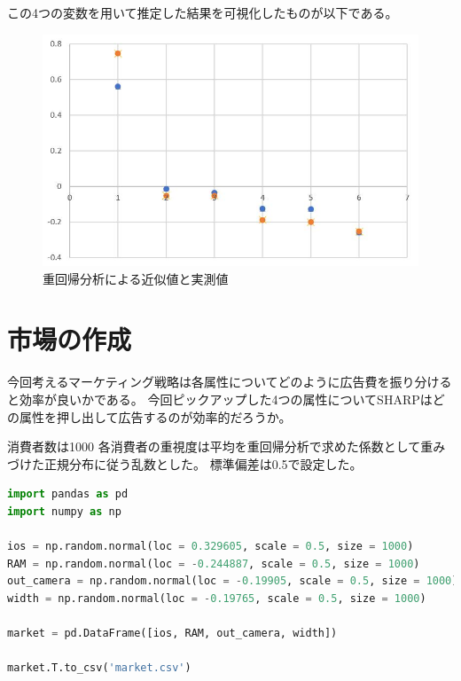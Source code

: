 \documentclass{jarticle}
\begin{document}
この4つの変数を用いて推定した結果を可視化したものが以下である。
\begin{figure}[H]
	\centering
	\includegraphics[width=15cm]{share_saigen.jpg}
	\caption{重回帰分析による近似値と実測値}
\end{figure}

\section{市場の作成}
今回考えるマーケティング戦略は各属性についてどのように広告費を振り分けると効率が良いかである。
今回ピックアップした4つの属性についてSHARPはどの属性を押し出して広告するのが効率的だろうか。

消費者数は1000
各消費者の重視度は平均を重回帰分析で求めた係数として重みづけた正規分布に従う乱数とした。
標準偏差は0.5で設定した。

\begin{lstlisting}[caption=市場の作成, frame=single, language=python]
import pandas as pd
import numpy as np

ios = np.random.normal(loc = 0.329605, scale = 0.5, size = 1000)
RAM = np.random.normal(loc = -0.244887, scale = 0.5, size = 1000)
out_camera = np.random.normal(loc = -0.19905, scale = 0.5, size = 1000)
width = np.random.normal(loc = -0.19765, scale = 0.5, size = 1000)

market = pd.DataFrame([ios, RAM, out_camera, width])

market.T.to_csv('market.csv')
\end{lstlisting}
\end{document}
